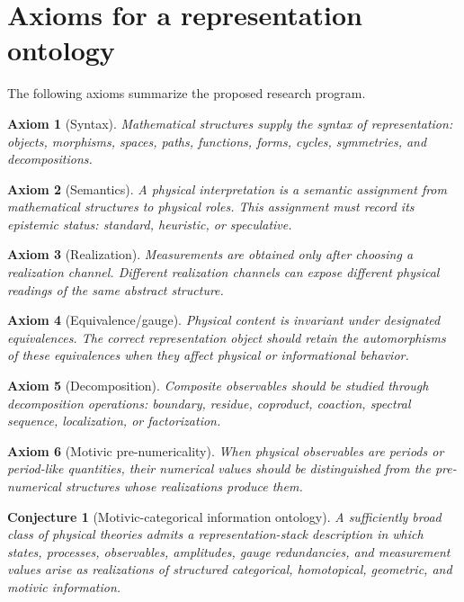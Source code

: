 \documentclass[11pt]{article}
\newtheorem{axiom}{Axiom}[section]
\newtheorem{conjecture}{Conjecture}[section]
\begin{document}
\section{Axioms for a representation ontology}

The following axioms summarize the proposed research program.

\begin{axiom}[Syntax]
Mathematical structures supply the syntax of representation: objects, morphisms, spaces, paths, functions, forms, cycles, symmetries, and decompositions.
\end{axiom}

\begin{axiom}[Semantics]
A physical interpretation is a semantic assignment from mathematical structures to physical roles. This assignment must record its epistemic status: standard, heuristic, or speculative.
\end{axiom}

\begin{axiom}[Realization]
Measurements are obtained only after choosing a realization channel. Different realization channels can expose different physical readings of the same abstract structure.
\end{axiom}

\begin{axiom}[Equivalence/gauge]
Physical content is invariant under designated equivalences. The correct representation object should retain the automorphisms of these equivalences when they affect physical or informational behavior.
\end{axiom}

\begin{axiom}[Decomposition]
Composite observables should be studied through decomposition operations: boundary, residue, coproduct, coaction, spectral sequence, localization, or factorization.
\end{axiom}

\begin{axiom}[Motivic pre-numericality]
When physical observables are periods or period-like quantities, their numerical values should be distinguished from the pre-numerical structures whose realizations produce them.
\end{axiom}

\begin{conjecture}[Motivic-categorical information ontology]
A sufficiently broad class of physical theories admits a representation-stack description in which states, processes, observables, amplitudes, gauge redundancies, and measurement values arise as realizations of structured categorical, homotopical, geometric, and motivic information.
\end{conjecture}
\end{document}
